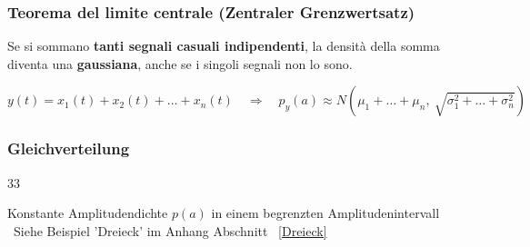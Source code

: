 \subsubsection{Teorema del limite centrale (Zentraler Grenzwertsatz)}

Se si sommano \textbf{tanti segnali casuali indipendenti}, la densità della somma
diventa una \textbf{gaussiana}, anche se i singoli segnali non lo sono.\vspace{-0.5em}

\[
y(t) = x_1(t) + x_2(t) + \dots + x_n(t)
\quad \Longrightarrow \quad
p_y(a) \approx N\!\left(\mu_1 + \dots + \mu_n,\ \sqrt{\sigma_1^2 + \dots + \sigma_n^2}\right)
\]

\subsubsection{Gleichverteilung}{33}

Konstante Amplitudendichte $p(a)$ in einem begrenzten Amplitudenintervall \\
\textrightarrow\ Siehe Beispiel 'Dreieck' im Anhang Abschnitt ~\ref{Dreieck} 